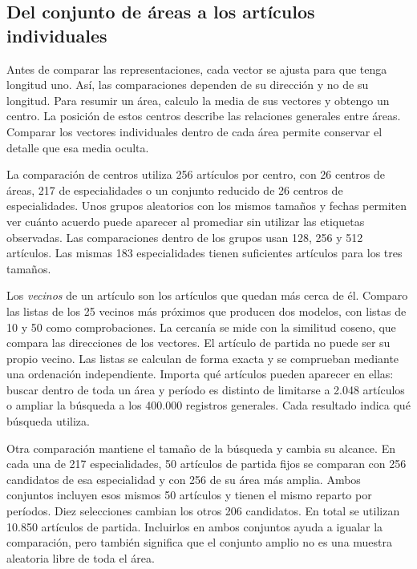 \subsection{Del conjunto de áreas a los artículos individuales}
Antes de comparar las representaciones, cada vector se ajusta para que tenga longitud uno. Así, las comparaciones dependen de su dirección y no de su longitud. Para resumir un área, calculo la media de sus vectores y obtengo un centro. La posición de estos centros describe las relaciones generales entre áreas. Comparar los vectores individuales dentro de cada área permite conservar el detalle que esa media oculta.

La comparación de centros utiliza 256 artículos por centro, con 26 centros de áreas, 217 de especialidades o un conjunto reducido de 26 centros de especialidades. Unos grupos aleatorios con los mismos tamaños y fechas permiten ver cuánto acuerdo puede aparecer al promediar sin utilizar las etiquetas observadas. Las comparaciones dentro de los grupos usan 128, 256 y 512 artículos. Las mismas 183 especialidades tienen suficientes artículos para los tres tamaños.

Los \emph{vecinos} de un artículo son los artículos que quedan más cerca de él. Comparo las listas de los 25 vecinos más próximos que producen dos modelos, con listas de 10 y 50 como comprobaciones. La cercanía se mide con la similitud coseno, que compara las direcciones de los vectores. El artículo de partida no puede ser su propio vecino. Las listas se calculan de forma exacta y se comprueban mediante una ordenación independiente. Importa qué artículos pueden aparecer en ellas: buscar dentro de toda un área y período es distinto de limitarse a 2.048 artículos o ampliar la búsqueda a los 400.000 registros generales. Cada resultado indica qué búsqueda utiliza.

Otra comparación mantiene el tamaño de la búsqueda y cambia su alcance. En cada una de 217 especialidades, 50 artículos de partida fijos se comparan con 256 candidatos de esa especialidad y con 256 de su área más amplia. Ambos conjuntos incluyen esos mismos 50 artículos y tienen el mismo reparto por períodos. Diez selecciones cambian los otros 206 candidatos. En total se utilizan 10.850 artículos de partida. Incluirlos en ambos conjuntos ayuda a igualar la comparación, pero también significa que el conjunto amplio no es una muestra aleatoria libre de toda el área.


